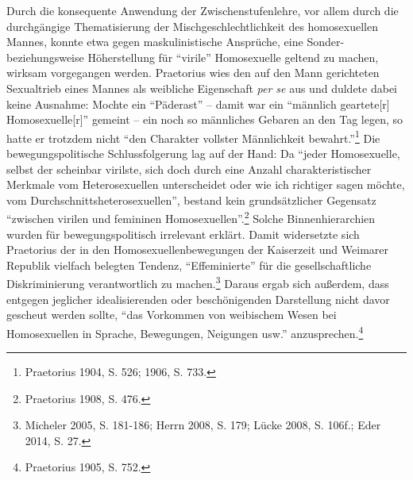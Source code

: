 \documentclass[a4paper,
fontsize=11pt,
oneside,
numbers=noperiodatend,
parskip=half-,
bibliography=totoc,
final
]{scrartcl}
\begin{document}
Durch die konsequente Anwendung der Zwischenstufenlehre, vor allem durch
die durchgängige Thematisierung der Mischgeschlechtlichkeit des
homosexuellen Mannes, konnte etwa gegen maskulinistische Ansprüche, eine
Sonder- beziehungsweise Höherstellung für \enquote{virile} Homosexuelle
geltend zu machen, wirksam vorgegangen werden. Praetorius wies den auf
den Mann gerichteten Sexualtrieb eines Mannes als weibliche Eigenschaft
\emph{per se} aus und duldete dabei keine Ausnahme: Mochte ein
\enquote{Päderast} -- damit war ein \enquote{männlich geartete{[}r{]}
Homosexuelle{[}r{]}} gemeint -- ein noch so männliches Gebaren an den
Tag legen, so hatte er trotzdem nicht \enquote{den Charakter vollster
Männlichkeit bewahrt.}\footnote{Praetorius 1904, S. 526; 1906, S. 733.}
Die bewegungspolitische Schlussfolgerung lag auf der Hand: Da
\enquote{jeder Homosexuelle, selbst der scheinbar virilste, sich doch
durch eine Anzahl charakteristischer Merkmale vom Heterosexuellen
unterscheidet oder wie ich richtiger sagen möchte, vom
Durchschnittsheterosexuellen}, bestand kein grundsätzlicher Gegensatz
\enquote{zwischen virilen und femininen Homosexuellen}.\footnote{Praetorius
  1908, S. 476.} Solche Binnenhierarchien wurden für bewegungspolitisch
irrelevant erklärt. Damit widersetzte sich Praetorius der in den
Homosexuellenbewegungen der Kaiserzeit und Weimarer Republik vielfach
belegten Tendenz, \enquote{Effeminierte} für die gesellschaftliche
Diskriminierung verantwortlich zu machen.\footnote{Micheler 2005, S.
  181-186; Herrn 2008, S. 179; Lücke 2008, S. 106f.; Eder 2014, S. 27.}
Daraus ergab sich außerdem, dass entgegen jeglicher idealisierenden oder
beschönigenden Darstellung nicht davor gescheut werden sollte,
\enquote{das Vorkommen von weibischem Wesen bei Homosexuellen in
Sprache, Bewegungen, Neigungen usw.} anzusprechen.\footnote{Praetorius
  1905, S. 752.}
\end{document}
